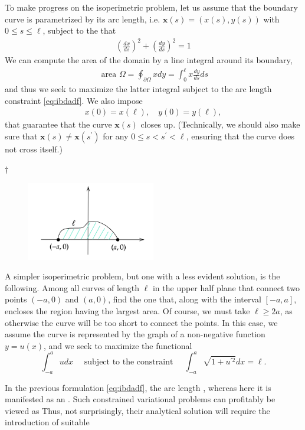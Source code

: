 \documentclass{article}
\begin{document}
To make progress on the isoperimetric problem, let us assume that the boundary curve is parametrized by its arc length, i.e. $\mathbf{x}(s)=(x(s), y(s))$ with $0 \leq s \leq \ell$, subject to the  that
\begin{align}
\left(\frac{d x}{d s}\right)^{2}+\left(\frac{d y}{d s}\right)^{2}=1\label{eq:ibdadf}
\end{align}
We can compute the area of the domain by a line integral around its boundary,
\begin{align*}
\text { area } \Omega=\oint_{\partial \Omega} x d y=\int_{0}^{\ell} x \frac{d y}{d s} d s
\end{align*}
and thus we seek to maximize the latter integral subject to the arc length constraint \cref{eq:ibdadf}. We also impose 
\begin{align*}
x(0)=x(\ell), \quad y(0)=y(\ell),
\end{align*}
that guarantee that the curve $\mathbf{x}(s)$ closes up. (Technically, we should also make sure that $\mathbf{x}(s) \neq \mathbf{x}\left(s^{\prime}\right)$ for any $0 \leq s<s^{\prime}<\ell$, ensuring that the curve does not cross itself.)

$\dagger$  
\begin{figure}[ht]
    \centering
    \includegraphics[width=0.5\textwidth]{Figs/a4.png}
\end{figure}

A simpler isoperimetric problem, but one with a less evident solution, is the following. Among all curves of length $\ell$ in the upper half plane that connect two points $(-a, 0)$ and $(a, 0)$, find the one that, along with the interval $[-a, a]$, encloses the region having the largest area. Of course, we must take $\ell \geq 2 a$, as otherwise the curve will be too short to connect the points. In this case, we assume the curve is represented by the graph of a non-negative function $y=u(x)$, and we seek to maximize the functional
$$\text{$\int_{-a}^{a} u d x \quad$ subject to the constraint $\quad \int_{-a}^{a} \sqrt{1+u^{\prime 2}} d x=\ell$.}$$
\begin{rema}
In the previous formulation \cref{eq:ibdadf}, the arc length , whereas here it is manifested as an . Such constrained variational problems can profitably be viewed as  Thus, not surprisingly, their analytical solution will require the introduction of suitable 
\end{rema}
\end{document}
